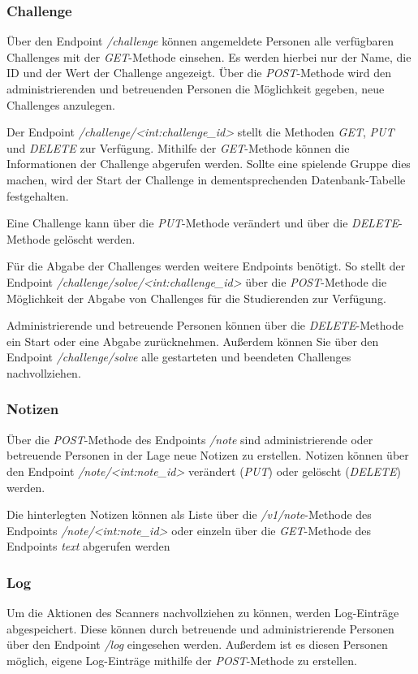 \subsubsection{Challenge}
Über den Endpoint \textit{/challenge} können angemeldete Personen alle verfügbaren Challenges mit der \textit{GET}-Methode einsehen. Es werden hierbei nur der Name, die ID und der Wert der Challenge angezeigt. Über die \textit{POST}-Methode wird den administrierenden und betreuenden Personen die Möglichkeit gegeben, neue Challenges anzulegen.

Der Endpoint \textit{/challenge/<int:challenge\_id>} stellt die Methoden \textit{GET}, \textit{PUT} und \textit{DELETE} zur Verfügung. Mithilfe der \textit{GET}-Methode können die Informationen der Challenge abgerufen werden. Sollte eine spielende Gruppe dies machen, wird der Start der Challenge in dementsprechenden Datenbank-Tabelle festgehalten.

Eine Challenge kann über die \textit{PUT}-Methode verändert und über die \textit{DELETE}-Methode gelöscht werden.

Für die Abgabe der Challenges werden weitere Endpoints benötigt. So stellt der Endpoint \textit{/challenge/solve/<int:challenge\_id>} über die \textit{POST}-Methode die Möglichkeit der Abgabe von Challenges für die Studierenden zur Verfügung.

Administrierende und betreuende Personen können über die \textit{DELETE}-Methode ein Start oder eine Abgabe zurücknehmen. Außerdem können Sie über den Endpoint \textit{/challenge/solve} alle gestarteten und beendeten Challenges nachvollziehen.

\subsubsection{Notizen}
Über die \textit{POST}-Methode des Endpoints \textit{/note} sind administrierende oder betreuende Personen in der Lage neue Notizen zu erstellen. Notizen können über den Endpoint \textit{/note/<int:note\_id>} verändert (\textit{PUT}) oder gelöscht (\textit{DELETE}) werden.

Die hinterlegten Notizen können als Liste über die \textit{/v1/note}-Methode des Endpoints \textit{/note/<int:note\_id>} oder einzeln über die \textit{GET}-Methode des Endpoints \textit{text} abgerufen werden

\subsubsection{Log}
Um die Aktionen des Scanners nachvollziehen zu können, werden Log-Einträge abgespeichert. Diese können durch betreuende und administrierende Personen über den Endpoint \textit{/log} eingesehen werden. Außerdem ist es diesen Personen möglich, eigene Log-Einträge mithilfe der \textit{POST}-Methode zu erstellen.


